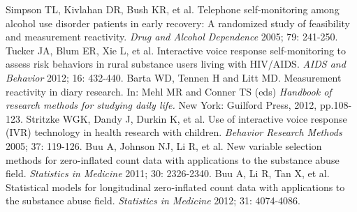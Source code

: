 \begin{thebibliography}
       Simpson TL, Kivlahan DR, Bush KR, et al. Telephone self-monitoring among alcohol use disorder patients in
early recovery: A randomized study of feasibility and measurement
reactivity. \textit{Drug and Alcohol Dependence} 2005; 79:
241-250.
        Tucker JA, Blum ER, Xie L, et al.
       Interactive voice response self-monitoring to assess risk behaviors in rural substance users living with HIV/AIDS. \textit{AIDS and Behavior} 2012; 16: 432-440.
        Barta WD, Tennen H and Litt MD. Measurement reactivity in diary research. In: Mehl MR and Conner TS (eds) \textit{Handbook of research methods for studying daily
       life.} New York: Guilford Press, 2012, pp.108-123.
        Stritzke WGK, Dandy J, Durkin K, et al.
       Use of interactive voice response (IVR) technology in health research with children. \textit{Behavior Research Methods} 2005; 37: 119-126.
        Buu A, Johnson NJ, Li R, et al. New variable selection methods for zero-inflated
       count data with applications to the substance abuse field.  \textit{Statistics in Medicine} 2011; 30: 2326-2340.
        Buu A, Li R, Tan X, et al. Statistical models for
       longitudinal zero-inflated count data with applications to the substance abuse field. \textit{Statistics in Medicine} 2012; 31: 4074-4086.
\end{thebibliography}



